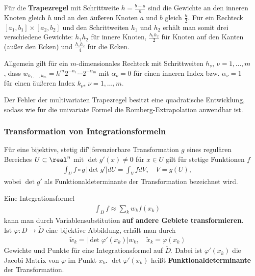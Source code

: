 \linie

Für die \textbf{Trapezregel} mit Schrittweite $h = \frac{b - a}{n}$
sind die Gewichte an den inneren Knoten gleich $h$ und an den äußeren
Knoten $a$ und $b$ gleich $\frac{h}{2}$.
Für ein Rechteck $[a_1, b_1] \times [a_2, b_2]$ und den Schrittweiten $h_1$
und $h_2$ erhält man somit drei verschiedene Gewichte:
$h_1 h_2$ für innere Knoten, $\frac{h_1 h_2}{2}$ für Knoten auf den Kanten
(außer den Ecken) und $\frac{h_1 h_2}{4}$ für die Ecken.

Allgemein gilt für ein $m$-dimensionales Rechteck mit Schrittweiten
$h_\nu$, $\nu = 1, \dotsc, m$, dass
$w_{k_1, \dotsc, k_m} = h^m 2^{-\alpha_1} \dotsm 2^{-\alpha_m}$
mit $\alpha_\nu = 0$ für einen inneren Index bzw.
$\alpha_\nu = 1$ für einen äußeren Index $k_\nu$, $\nu = 1, \dotsc, m$.

Der Fehler der multivariaten Trapezregel besitzt eine quadratische Entwicklung,
sodass wie für die univariate Formel die Romberg-Extrapolation anwendbar ist.

\pagebreak

\subsubsection{%
    Transformation von Integrationsformeln%
}

Für eine bijektive, stetig dif"|ferenzierbare Transformation $g$ eines
regulären Bereiches $U \subset \real^n$ mit
$\det g'(x) \not= 0$ für $x \in U$
gilt für stetige Funktionen $f$
\begin{align*}
    \int_U f \circ g |\det g'| dU = \int_V f dV, \quad V = g(U),
\end{align*}
wobei $\det g'$ als Funktionaldeterminante der Transformation bezeichnet wird.

\linie

Eine Integrationsformel
\begin{align*}
    \int_D f \approx \sum_k w_k f(x_k)
\end{align*}
kann man durch Variablensubstitution
\textbf{auf andere Gebiete transformieren}. \\
Ist $\varphi\colon D \rightarrow \widetilde{D}$ eine bijektive Abbildung,
erhält man durch
\begin{align*}
    \widetilde{w}_k = \left|\det \varphi'(x_k)\right| w_k, \quad
    \widetilde{x}_k = \varphi(x_k)
\end{align*}
Gewichte und Punkte für eine Integrationsformel auf $\widetilde{D}$.
Dabei ist $\varphi'(x_k)$ die Jacobi-Matrix von $\varphi$ im Punkt $x_k$.
$\det \varphi'(x_k)$ heißt \textbf{Funktionaldeterminante} der Transformation.

